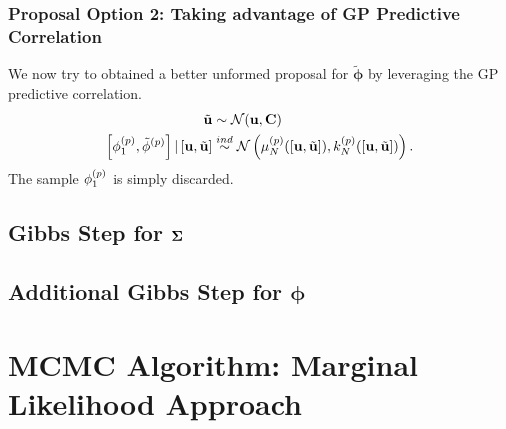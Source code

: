 \documentclass[12pt]{article}
\newcommand{\bphi}{\boldsymbol{\phi}}
\begin{document}
\subsubsection{Proposal Option 2: Taking advantage of GP Predictive Correlation}
We now try to obtained a better unformed proposal for $\tilde{\bphi}$ by leveraging the GP predictive correlation. 
\begin{align*}
\tilde{\mathbf{u}} &\sim \mathcal{N}(\mathbf{u}, \mathbf{C}) \\
\left[{\phi}^{(p)}_1, {\tilde{\phi}}^{(p)}\right]|\left[\mathbf{u}, \tilde{\mathbf{u}}\right] &\overset{ind}{\sim} \mathcal{N}\left(\mu_{N}^{(p)}(\left[\mathbf{u}, \tilde{\mathbf{u}}\right]), k_{N}^{(p)}(\left[\mathbf{u}, \tilde{\mathbf{u}}\right])\right).
\end{align*}
The sample ${\phi}^{(p)}_1$ is simply discarded. 

\subsection{Gibbs Step for $\boldsymbol{\Sigma}$}

\subsection{Additional Gibbs Step for $\bphi$}



\section{MCMC Algorithm: Marginal Likelihood Approach}
\end{document}
